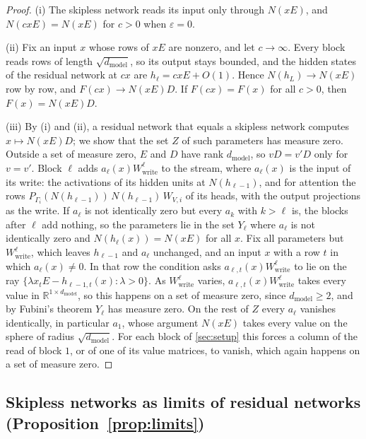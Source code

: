 \documentclass[10pt]{article}
\theoremstyle{definition}
\theoremstyle{remark}
\newcommand{\R}{\mathbb{R}}
\newcommand{\Wwrite}{W_{\mathrm{write}}}
\newcommand{\dm}{d_{\mathrm{model}}}
\begin{document}
\begin{proof}
(i) The skipless network reads its input only through $N(xE)$, and $N(cxE) = N(xE)$ for $c > 0$ when $\varepsilon = 0$.

(ii) Fix an input $x$ whose rows of $xE$ are nonzero, and let $c \to \infty$. Every block reads rows of length $\sqrt{\dm}$, so its output stays bounded, and the hidden states of the residual network at $cx$ are $h_\ell = cxE + O(1)$. Hence $N(h_L) \to N(xE)$ row by row, and $F(cx) \to N(xE)D$. If $F(cx) = F(x)$ for all $c > 0$, then $F(x) = N(xE)D$.

(iii) By (i) and (ii), a residual network that equals a skipless network computes $x \mapsto N(xE)D$; we show that the set $Z$ of such parameters has measure zero. Outside a set of measure zero, $E$ and $D$ have rank $\dm$, so $vD = v'D$ only for $v = v'$. Block $\ell$ adds $a_\ell(x)\Wwrite^{\ell}$ to the stream, where $a_\ell(x)$ is the input of its write: the activations of its hidden units at $N(h_{\ell-1})$, and for attention the rows $P_{\Gamma_i}(N(h_{\ell-1}))\,N(h_{\ell-1})\,W_{V,i}$ of its heads, with the output projections as the write. If $a_\ell$ is not identically zero but every $a_k$ with $k > \ell$ is, the blocks after $\ell$ add nothing, so the parameters lie in the set $Y_\ell$ where $a_\ell$ is not identically zero and $N(h_\ell(x)) = N(xE)$ for all $x$. Fix all parameters but $\Wwrite^{\ell}$, which leaves $h_{\ell-1}$ and $a_\ell$ unchanged, and an input $x$ with a row $t$ in which $a_\ell(x) \neq 0$. In that row the condition asks $a_{\ell,t}(x)\Wwrite^{\ell}$ to lie on the ray $\{\lambda x_tE - h_{\ell-1,t}(x) : \lambda > 0\}$. As $\Wwrite^{\ell}$ varies, $a_{\ell,t}(x)\Wwrite^{\ell}$ takes every value in $\R^{1\times\dm}$, so this happens on a set of measure zero, since $\dm \ge 2$, and by Fubini's theorem $Y_\ell$ has measure zero. On the rest of $Z$ every $a_\ell$ vanishes identically, in particular $a_1$, whose argument $N(xE)$ takes every value on the sphere of radius $\sqrt{\dm}$. For each block of \cref{sec:setup} this forces a column of the read of block $1$, or of one of its value matrices, to vanish, which again happens on a set of measure zero.
\end{proof}

\subsection{Skipless networks as limits of residual networks\texorpdfstring{ (Proposition~\ref*{prop:limits})}{}}\label{app:prf-limits}
\end{document}
